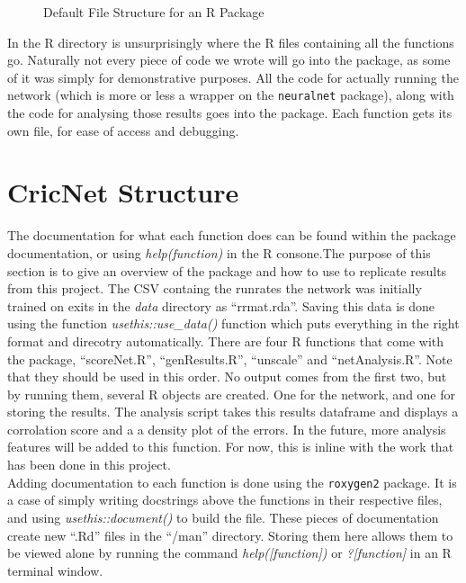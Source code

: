 \begin{figure}[h]
\caption{Default File Structure for an R Package}




\end{figure}

In the R directory is unsurprisingly where the R files containing all the functions go. Naturally not every piece of code we wrote will go into the package, as some of it was simply for demonstrative purposes. All the code for actually running the network (which is more or less a wrapper on the \verb|neuralnet| package), along with the code for analysing those results goes into the package.
Each function gets its own file, for ease of access and debugging. 

\section{CricNet Structure}

The documentation for what each function does can be found within the package documentation, or using \textit{help(function)} in the R consone.The purpose of this section is to give an overview of the package and how to use to replicate results from this project.
The CSV containg the runrates the network was initially trained on exits in the \textit{data} directory as ``rrmat.rda''. Saving this data is done using the function \textit{usethis::use\_data()} function which puts everything in the right format and direcotry automatically. There are four R functions that come with the package, ``scoreNet.R'', ``genResults.R'', ``unscale'' and ``netAnalysis.R''. Note that they should be used in this order. No output comes from the first two, but by running them, several R objects are created. One for the network, and one for storing the results. The analysis script takes this results dataframe and displays a corrolation score and a a density plot of the errors. In the future, more analysis features will be added to this function. For now, this is inline with the work that has been done in this project. \\

Adding documentation to each function is done using the \verb|roxygen2| package. It is a case of simply writing docstrings above the functions in their respective files, and using \textit{usethis::document()} to build the file. 
These pieces of documentation create new ``.Rd'' files in the ``/man'' directory. Storing them here allows them to be viewed alone by running the command \textit{help([function])} or \textit{?[function]} in an R terminal window. 

